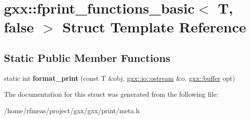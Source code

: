 \hypertarget{structgxx_1_1fprint__functions__basic_3_01T_00_01false_01_4}{}\section{gxx\+:\+:fprint\+\_\+functions\+\_\+basic$<$ T, false $>$ Struct Template Reference}
\label{structgxx_1_1fprint__functions__basic_3_01T_00_01false_01_4}
\subsection*{Static Public Member Functions}
\begin{DoxyCompactItemize}
\item 
static int {\bfseries format\+\_\+print} (const T \&obj, \hyperlink{classgxx_1_1io_1_1ostream}{gxx\+::io\+::ostream} \&o, \hyperlink{classgxx_1_1buffer}{gxx\+::buffer} opt)\hypertarget{structgxx_1_1fprint__functions__basic_3_01T_00_01false_01_4_abe1194a17234dd7cd2ffb58e5c9ce2c1}{}\label{structgxx_1_1fprint__functions__basic_3_01T_00_01false_01_4_abe1194a17234dd7cd2ffb58e5c9ce2c1}

\end{DoxyCompactItemize}


The documentation for this struct was generated from the following file\+:\begin{DoxyCompactItemize}
\item 
/home/rfmeas/project/gxx/gxx/print/meta.\+h\end{DoxyCompactItemize}
